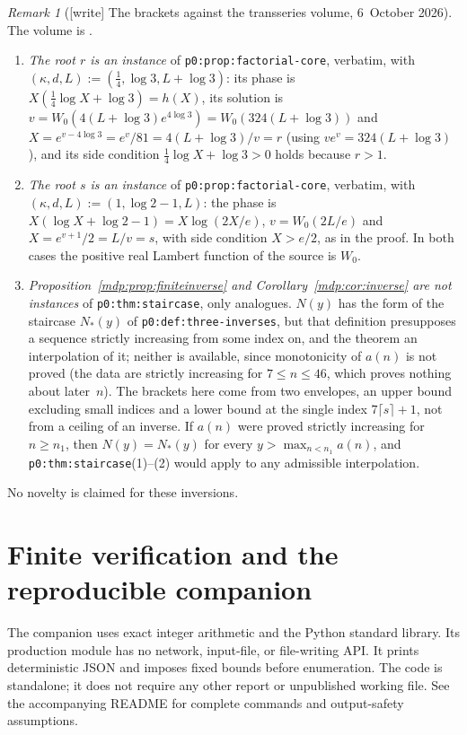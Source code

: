 \documentclass[11pt,letterpaper]{article}
\numberwithin{equation}{section}
\theoremstyle{remark}\newtheorem{remark}[theorem]{Remark}
\newcommand{\file}[1]{\nolinkurl{#1}}
\begin{document}
\begin{remark}[{[write]} The brackets against the transseries volume, 6~October 2026]\label{mdp:rem:transseries}
The volume is
.
\begin{enumerate}
\item[(a)] \emph{The root $r$ is an instance} of
 \file{p0:prop:factorial-core}, verbatim, with
 $(\kappa,d,L):=(\tfrac14,\log3,L+\log3)$: its phase is
 $X(\tfrac14\log X+\log3)=h(X)$, its solution is $v=W_0(4(L+\log3)e^{4\log3})
 =W_0(324(L+\log3))$ and $X=e^{v-4\log3}=e^v/81=4(L+\log3)/v=r$ (using
 $ve^v=324(L+\log3)$), and its side condition $\tfrac14\log X+\log3>0$
 holds because $r>1$.
\item[(b)] \emph{The root $s$ is an instance} of
 \file{p0:prop:factorial-core}, verbatim, with $(\kappa,d,L):=(1,\log2-1,L)$:
 the phase is $X(\log X+\log2-1)=X\log(2X/e)$, $v=W_0(2L/e)$ and
 $X=e^{v+1}/2=L/v=s$, with side condition $X>e/2$, as in the proof. In both
 cases the positive real Lambert function of the source is $W_0$.
\item[(c)] \emph{Proposition~\ref{mdp:prop:finiteinverse} and
 Corollary~\ref{mdp:cor:inverse} are not instances} of
 \file{p0:thm:staircase}, only analogues. $N(y)$ has the form of the
 staircase $N_\ast(y)$ of \file{p0:def:three-inverses}, but that definition
 presupposes a sequence strictly increasing from some index on, and the
 theorem an interpolation of it; neither is available, since monotonicity of
 $a(n)$ is not proved (the data are strictly increasing for
 $7\le n\le46$, which proves nothing about later~$n$). The brackets here
 come from two envelopes, an upper bound excluding small indices and a lower
 bound at the single index $7\lceil s\rceil+1$, not from a ceiling of an
 inverse. If $a(n)$ were proved strictly increasing for $n\ge n_1$, then
 $N(y)=N_\ast(y)$ for every $y>\max_{n<n_1}a(n)$, and
 \file{p0:thm:staircase}(1)--(2) would apply to any admissible
 interpolation.
\end{enumerate}
No novelty is claimed for these inversions.
\end{remark}

\section{Finite verification and the reproducible companion}
The companion uses exact integer arithmetic and the Python standard
library. Its production module has no network, input-file, or
file-writing API. It prints deterministic JSON and imposes fixed bounds
before enumeration. The code is standalone; it does not require any
other report or unpublished working file. See the accompanying README
for complete commands and output-safety assumptions.
\end{document}
